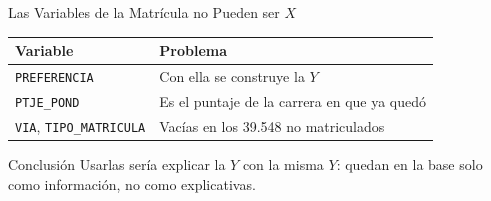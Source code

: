\documentclass[10pt, aspectratio=169, xcolor=table]{beamer}
\begin{document}
\begin{frame}{Las Variables de la Matrícula no Pueden ser $X$}
  \begin{table}
    \centering
    \small
    \begin{tabular}{ll}
      \toprule
      \textbf{\textcolor{USACHNavy}{Variable}} & \textbf{\textcolor{USACHNavy}{Problema}} \\
      \midrule
      \texttt{PREFERENCIA}                   & Con ella se construye la $Y$ \\
      \texttt{PTJE\_POND}                    & Es el puntaje de la carrera en que ya quedó \\
      \texttt{VIA}, \texttt{TIPO\_MATRICULA} & Vacías en los 39.548 no matriculados \\
      \bottomrule
    \end{tabular}
  \end{table}

  \vspace{0.3cm}
  \begin{block}{Conclusión}
    Usarlas sería explicar la $Y$ con la misma $Y$: quedan en la base solo como información, no como explicativas.
  \end{block}
\end{frame}
\end{document}
